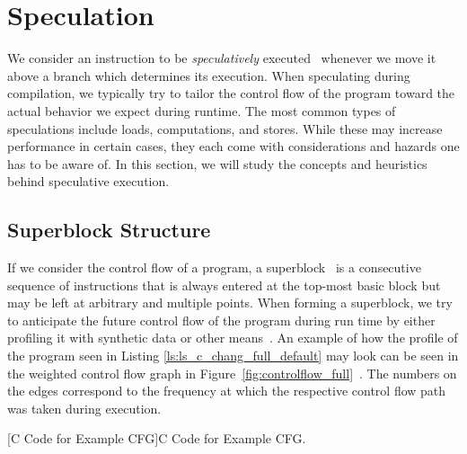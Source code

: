 \section{Speculation}
\label{sec:speculation}
We consider an instruction to be \textit{speculatively} executed~\cite{chang95} whenever we move it above a branch which determines its execution. When speculating during compilation, we typically try to tailor the control flow of the program toward the actual behavior we expect during runtime. The most common types of speculations include loads, computations, and stores. While these may increase performance in certain cases, they each come with considerations and hazards one has to be aware of. In this section, we will study the concepts and heuristics behind speculative execution. 

\subsection{Superblock Structure}
\label{sec:superblock_struct}
If we consider the control flow of a program, a superblock~\cite{10.1145/161541.159765} is a consecutive sequence of instructions that is always entered at the top-most basic block but may be left at arbitrary and multiple points. When forming a superblock, we try to anticipate the future control flow of the program during run time by either profiling it with synthetic data or other means~\cite{639244}. An example of how the profile of the program seen in Listing \ref{ls:ls_c_chang_full_default} may look can be seen in the weighted control flow graph in Figure~\ref{fig:controlflow_full}~\cite{chang95}. The numbers on the edges correspond to the frequency at which the respective control flow path was taken during execution. 

\begin{center}
    \begin{minipage}{.45\textwidth}
            
        \captionsetup{type=Listing}
        [C Code for Example CFG]{C Code for Example CFG.}
        \label{ls:ls_c_chang_full_default}
    \end{minipage}
\end{center}

